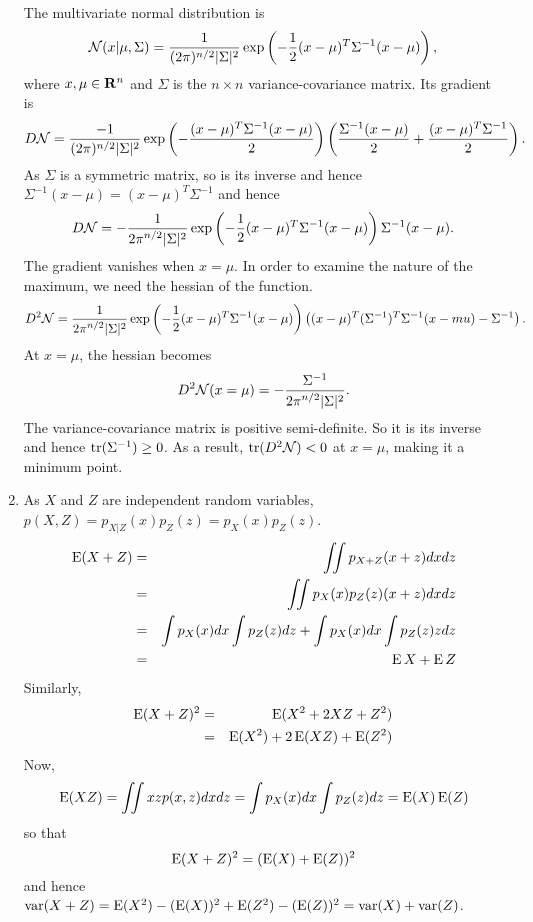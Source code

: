 \begin{enumerate}
The multivariate normal distribution is
\[
\mathcal{N}(x|\mu,\Sigma) = \frac{1}{(2\pi)^{n/2}\lvert\Sigma\rvert^2}\exp\left(-\frac{1}{2}(x - \mu)^T\Sigma^{-1}(x - \mu)\right),
\]
where $x, \mu \in \mathbf{R}^n$ and $\Sigma$ is the $n \times n$ variance-covariance matrix. Its gradient is
\[
D\mathcal{N} = \frac{-1}{(2\pi)^{n/2}\lvert\Sigma\rvert^2}\exp\left(-\frac{(x - \mu)^T\Sigma^{-1}(x - \mu)}{2}\right)\left(\frac{\Sigma^{-1}(x - \mu)}{2} + \frac{(x - \mu)^T\Sigma^{-1}}{2}\right).
\]
As $\Sigma$ is a symmetric matrix, so is its inverse and hence $\Sigma^{-1}(x - \mu) = (x - \mu)^T\Sigma^{-1}$ and hence
\[
D\mathcal{N} = -\frac{1}{{2\pi}^{n/2}\lvert\Sigma\rvert^2}\exp\left(-\frac{1}{2}(x - \mu)^T\Sigma^{-1}(x - \mu)\right)\Sigma^{-1}(x - \mu).
\]
The gradient vanishes when $x = \mu$. In order to examine the nature of the maximum, we need the
hessian of the function. 
\[
D^2\mathcal{N} = \frac{1}{{2\pi}^{n/2}\lvert\Sigma\rvert^2}\exp\left(-\frac{1}{2}(x - \mu)^T\Sigma^{-1}(x - \mu)\right)\left((x - \mu)^T(\Sigma^{-1})^T\Sigma^{-1}(x - mu) - \Sigma^{-1}\right).
\]
At $x = \mu$, the hessian becomes
\[
D^2\mathcal{N}(x = \mu) = -\frac{\Sigma^{-1}}{{2\pi}^{n/2}\lvert\Sigma\rvert^2}.
\]
The variance-covariance matrix is positive semi-definite. So it is its inverse and hence $\operatorname{tr}(\Sigma^{-1}) \ge 0$.
As a result, $\operatorname{tr}(D^2\mathcal{N}) < 0$ at $x = \mu$, making it a minimum point.

\item As $X$ and $Z$ are independent random variables, $p(X, Z) = p_{X|Z}(x)p_Z(z) = p_X(x)p_Z(z)$. 
\begin{eqnarray*}
\operatorname{E}(X+Z) &=& \iint p_{X+Z}(x+z)dxdz \\
         &=& \iint p_X(x)p_Z(z)(x+z)dxdz \\
         &=& \int p_X(x)dx\int p_Z(z)dz + \int p_X(x)dx\int p_Z(z)zdz \\
         &=& \operatorname{E}{X} + \operatorname{E}{Z}
\end{eqnarray*}
Similarly,
\begin{eqnarray*}
\operatorname{E}(X+Z)^2 &=& \operatorname{E}(X^2 + 2XZ + Z^2) \\
           &=& \operatorname{E}(X^2) + 2\operatorname{E}(XZ) + \operatorname{E}(Z^2)
\end{eqnarray*}
Now,
\[
\operatorname{E}(XZ) = \iint xzp(x,z)dxdz = \int p_X(x)dx\int p_Z(z)dz = \operatorname{E}(X)\operatorname{E}(Z)
\]
so that
\[
\operatorname{E}(X+Z)^2 = (\operatorname{E}(X) + \operatorname{E}(Z))^2
\]
and hence $\operatorname{var}(X + Z) = \operatorname{E}(X^2) - (\operatorname{E}(X))^2 + \operatorname{E}(Z^2) - (\operatorname{E}(Z))^2 = \operatorname{var}(X) + \operatorname{var}(Z)$.


\end{enumerate}
